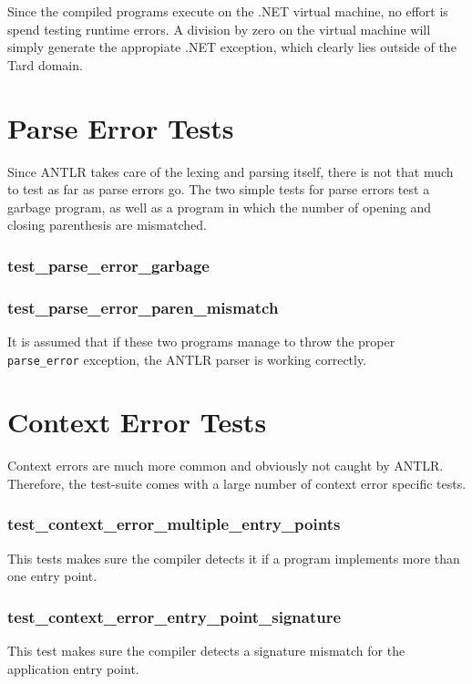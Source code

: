 \documentclass{report}
\begin{document}
Since the compiled programs execute on the .NET virtual machine, no
effort is spend testing runtime errors. A division by zero on the
virtual machine will simply generate the appropiate .NET exception,
which clearly lies outside of the Tard domain.

\section{Parse Error Tests}

Since ANTLR takes care of the lexing and parsing itself, there is
not that much to test as far as parse errors go. The two simple
tests for parse errors test a garbage program, as well as a program
in which the number of opening and closing parenthesis are
mismatched.

\subsubsection*{test\_parse\_error\_garbage}
\subsubsection*{test\_parse\_error\_paren\_mismatch}

It is assumed that if these two programs manage to throw the proper
\texttt{parse\_error} exception, the ANTLR parser is working
correctly.

\section{Context Error Tests}

Context errors are much more common and obviously not caught by
ANTLR. Therefore, the test-suite comes with a large number of
context error specific tests.

\subsubsection*{test\_context\_error\_multiple\_entry\_points}

This tests makes sure the compiler detects it if a program
implements more than one entry point.

\subsubsection*{test\_context\_error\_entry\_point\_signature}

This test makes sure the compiler detects a signature mismatch for
the application entry point.
\end{document}
